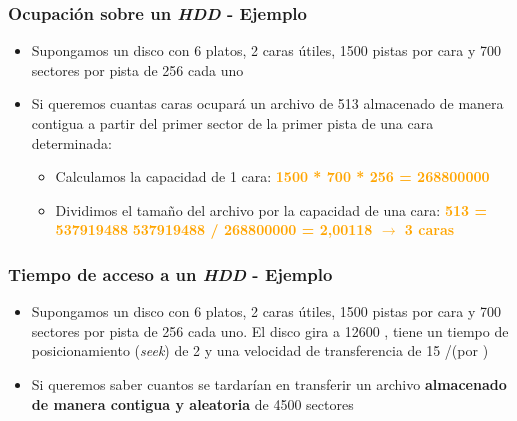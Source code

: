 \begin{frame}
  \frametitle{Ocupación sobre un \textit{HDD} - Ejemplo}
  \begin{itemize}
    \item Supongamos un disco con 6 platos, 2 caras útiles, 1500 pistas por cara y 700 sectores por pista de 256 \bytes cada uno
    \item Si queremos cuantas caras ocupará un archivo de 513 \mebishort\bytes almacenado de manera contigua a partir del primer sector de la primer pista de una cara determinada:
    \begin{itemize}
      \item Calculamos la capacidad de 1 cara:
      \linebreak      
      \hspace{35pt} \textcolor{orange}{\textbf{1500 * 700 * 256 \bytes = 268800000 \bytes}}
      \linebreak
      \item Dividimos el tamaño del archivo por la capacidad de una cara:
      \hspace{35pt} \textcolor{orange}{\textbf{513 \mebishort\bytesshort = 537919488 \bytes}}
      \linebreak
      \hspace{35pt} \textcolor{orange}{\textbf{537919488 / 268800000 = 2,00118  $\rightarrow$ 3 caras}}
    \end{itemize}
  \end{itemize}
\end{frame}

\begin{frame}
  \frametitle{Tiempo de acceso a un \textit{HDD} - Ejemplo}
  \begin{itemize}
    \item Supongamos un disco con 6 platos, 2 caras útiles, 1500 pistas por cara y 700 sectores por pista de 256 \bytes cada uno. El disco gira a 12600 \rpm, tiene un tiempo de posicionamiento (\textit{seek}) de 2 \milisegundos y una velocidad de transferencia de 15 \mebishort\bitsshort/\s (\mebi\bits por \segundo)
    \item Si queremos saber cuantos \milisegundos se tardarían en transferir un archivo \textbf{almacenado de manera contigua y aleatoria} de 4500 sectores
  \end{itemize}
\end{frame}

